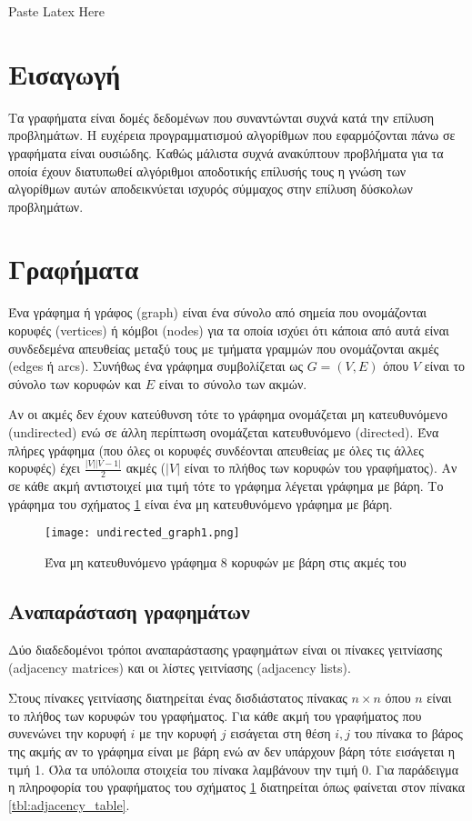 Paste Latex Here\section{Εισαγωγή}
Τα γραφήματα είναι δομές δεδομένων που συναντώνται συχνά κατά την επίλυση προβλημάτων. Η ευχέρεια προγραμματισμού αλγορίθμων που εφαρμόζονται πάνω σε γραφήματα είναι ουσιώδης. Καθώς μάλιστα συχνά ανακύπτουν προβλήματα για τα οποία έχουν διατυπωθεί αλγόριθμοι αποδοτικής επίλυσής τους η γνώση των αλγορίθμων αυτών αποδεικνύεται ισχυρός σύμμαχος στην επίλυση δύσκολων προβλημάτων. 

\section{Γραφήματα}
Ένα γράφημα ή γράφος (graph) είναι ένα σύνολο από σημεία που ονομάζονται κορυφές (vertices) ή κόμβοι (nodes) για τα οποία ισχύει ότι κάποια από αυτά είναι συνδεδεμένα απευθείας μεταξύ τους με τμήματα γραμμών που ονομάζονται ακμές (edges ή arcs). Συνήθως ένα γράφημα συμβολίζεται ως $G=(V,E)$ όπου $V$ είναι το σύνολο των κορυφών και $E$ είναι το σύνολο των ακμών.

Αν οι ακμές δεν έχουν κατεύθυνση τότε το γράφημα ονομάζεται μη κατευθυνόμενο (undirected) ενώ σε άλλη περίπτωση ονομάζεται κατευθυνόμενο (directed). Ένα πλήρες γράφημα (που όλες οι κορυφές συνδέονται απευθείας με όλες τις άλλες κορυφές) έχει $\frac{|V||V-1|}{2}$ ακμές ($|V|$ είναι το πλήθος των κορυφών του γραφήματος). Αν σε κάθε ακμή αντιστοιχεί μια τιμή τότε το γράφημα λέγεται γράφημα με βάρη. Το γράφημα του σχήματος \ref{fig:undirected_graph} είναι ένα μη κατευθυνόμενο γράφημα με βάρη.

\begin{figure}[ht]
	\centering
	\texttt{[image: undirected\_graph1.png]}
	\caption{Ένα μη κατευθυνόμενο γράφημα 8 κορυφών με βάρη στις ακμές του}
	\label{fig:undirected_graph}
\end{figure}

\subsection{Αναπαράσταση γραφημάτων}
Δύο διαδεδομένοι τρόποι αναπαράστασης γραφημάτων είναι οι πίνακες γειτνίασης (adjacency matrices) και οι λίστες γειτνίασης (adjacency lists).

Στους πίνακες γειτνίασης διατηρείται ένας δισδιάστατος πίνακας $n \times n$ όπου $n$ είναι το πλήθος των κορυφών του γραφήματος. Για κάθε ακμή του γραφήματος που συνενώνει την κορυφή $i$ με την κορυφή $j$ εισάγεται στη θέση $i,j$ του πίνακα το βάρος της ακμής αν το γράφημα είναι με βάρη ενώ αν δεν υπάρχουν βάρη τότε εισάγεται η τιμή 1. Όλα τα υπόλοιπα στοιχεία του πίνακα λαμβάνουν την τιμή 0. Για παράδειγμα η πληροφορία του γραφήματος του σχήματος \ref{fig:undirected_graph} διατηρείται όπως φαίνεται στον πίνακα \ref{tbl:adjacency_table}.

